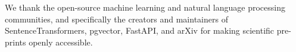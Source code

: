 \begin{acks}
We thank the open-source machine learning and natural language processing communities, and specifically the creators and maintainers of SentenceTransformers, pgvector, FastAPI, and arXiv for making scientific pre-prints openly accessible.
\end{acks}
